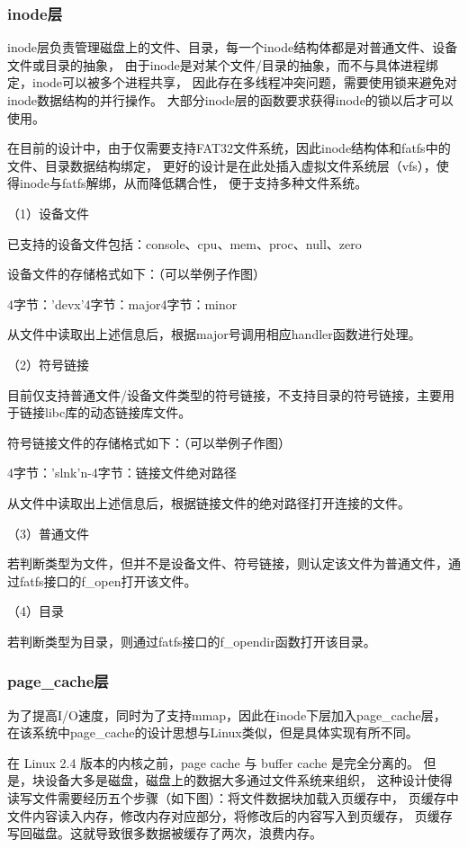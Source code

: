 \documentclass[UTF8,a4paper,10pt]{ctexart}
\begin{document}
\subsubsection{inode层}

inode层负责管理磁盘上的文件、目录，每一个inode结构体都是对普通文件、设备文件或目录的抽象，
由于inode是对某个文件/目录的抽象，而不与具体进程绑定，inode可以被多个进程共享，
因此存在多线程冲突问题，需要使用锁来避免对inode数据结构的并行操作。
大部分inode层的函数要求获得inode的锁以后才可以使用。

在目前的设计中，由于仅需要支持FAT32文件系统，因此inode结构体和fatfs中的文件、目录数据结构绑定，
更好的设计是在此处插入虚拟文件系统层（vfs），使得inode与fatfs解绑，从而降低耦合性，
便于支持多种文件系统。

（1）设备文件

已支持的设备文件包括：console、cpu、mem、proc、null、zero

设备文件的存储格式如下：（可以举例子作图）

{4字节：'devx'}{4字节：major}{4字节：minor}

从文件中读取出上述信息后，根据major号调用相应handler函数进行处理。

（2）符号链接

目前仅支持普通文件/设备文件类型的符号链接，不支持目录的符号链接，主要用于链接libc库的动态链接库文件。

符号链接文件的存储格式如下：（可以举例子作图）

{4字节：'slnk'}{n-4字节：链接文件绝对路径}

从文件中读取出上述信息后，根据链接文件的绝对路径打开连接的文件。

（3）普通文件

若判断类型为文件，但并不是设备文件、符号链接，则认定该文件为普通文件，通过fatfs接口的f\_open打开该文件。

（4）目录

若判断类型为目录，则通过fatfs接口的f\_opendir函数打开该目录。

\subsubsection{page\_cache层}

为了提高I/O速度，同时为了支持mmap，因此在inode下层加入page\_cache层，
在该系统中page\_cache的设计思想与Linux类似，但是具体实现有所不同。

在 Linux 2.4 版本的内核之前，page cache 与 buffer cache 是完全分离的。
但是，块设备大多是磁盘，磁盘上的数据大多通过文件系统来组织，
这种设计使得读写文件需要经历五个步骤（如下图）：将文件数据块加载入页缓存中，
页缓存中文件内容读入内存，修改内存对应部分，将修改后的内容写入到页缓存，
页缓存写回磁盘。这就导致很多数据被缓存了两次，浪费内存。
\end{document}
